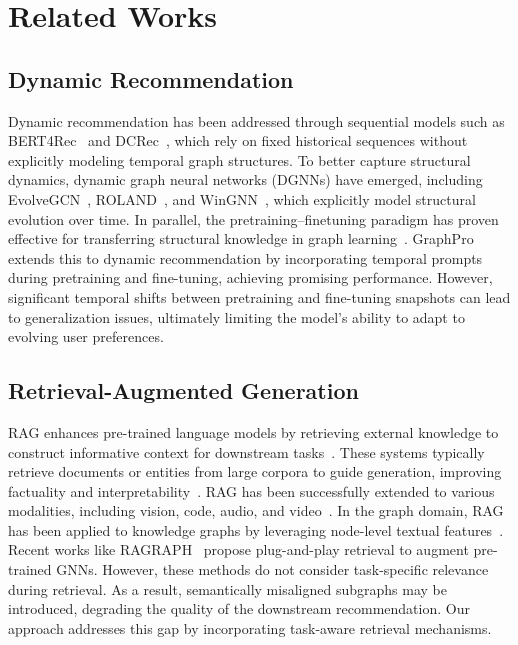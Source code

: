\documentclass[letterpaper]{article} %
\begin{document}
\section{Related Works}
\subsection{Dynamic Recommendation}

Dynamic recommendation has been addressed through sequential models such as BERT4Rec~\cite{sun2019bert4rec} and DCRec~\cite{yang2023debiased}, which rely on fixed historical sequences without explicitly modeling temporal graph structures. To better capture structural dynamics, dynamic graph neural networks (DGNNs) have emerged, including EvolveGCN~\cite{pareja2020evolvegcn}, ROLAND~\cite{you2022roland}, and WinGNN~\cite{zhu2023wingnn}, which explicitly model structural evolution over time. In parallel, the pretraining–finetuning paradigm has proven effective for transferring structural knowledge in graph learning~\cite{yu2025uniform, yu2025non, yu2024survey}. GraphPro~\cite{yang2024graphpro} extends this to dynamic recommendation by incorporating temporal prompts during pretraining and fine-tuning, achieving promising performance. However, significant temporal shifts between pretraining and fine-tuning snapshots can lead to generalization issues, ultimately limiting the model’s ability to adapt to evolving user preferences.

\subsection{Retrieval-Augmented Generation}

RAG enhances pre-trained language models by retrieving external knowledge to construct informative context for downstream tasks~\cite{rag, lewis2021retrievalaugmented}. These systems typically retrieve documents or entities from large corpora to guide generation, improving factuality and interpretability~\cite{sarthi2024raptor, gao2022precise}. RAG has been successfully extended to various modalities, including vision, code, audio, and video~\cite{zheng2025retrieval, yang2025empirical, xue2024retrieval, singh2025agentic}. In the graph domain, RAG has been applied to knowledge graphs by leveraging node-level textual features~\cite{xu2024generate}. Recent works like RAGRAPH~\cite{jiang2024ragraph} propose plug-and-play retrieval to augment pre-trained GNNs. However, these methods do not consider task-specific relevance during retrieval. 
As a result, semantically misaligned subgraphs may be introduced, degrading the quality of the downstream recommendation. 
Our approach addresses this gap by incorporating task-aware retrieval mechanisms.
\end{document}
